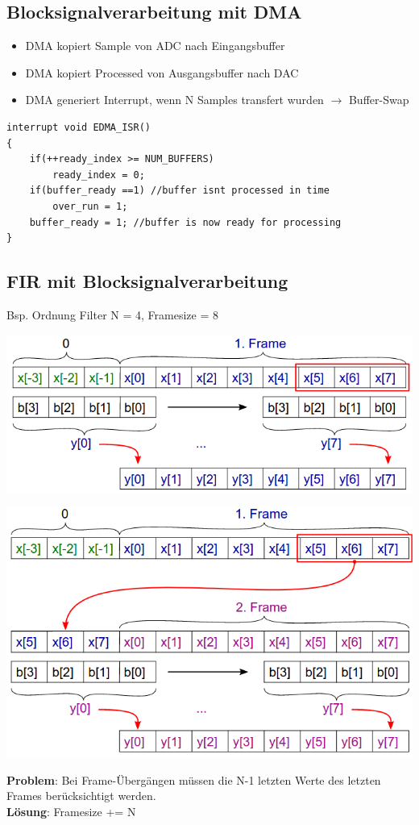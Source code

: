 \documentclass[10pt,a4paper]{article}
\begin{document}
\subsection{Blocksignalverarbeitung mit DMA}
\begin{itemize}
    \item DMA kopiert Sample von ADC nach Eingangsbuffer
    \item DMA kopiert Processed von Ausgangsbuffer nach DAC
    \item DMA generiert Interrupt, wenn N Samples transfert wurden $\rightarrow$ Buffer-Swap
\end{itemize}
\begin{verbatim}
interrupt void EDMA_ISR()
{
    if(++ready_index >= NUM_BUFFERS)
        ready_index = 0;
    if(buffer_ready ==1) //buffer isnt processed in time
        over_run = 1;
    buffer_ready = 1; //buffer is now ready for processing
}
\end{verbatim}

\subsection{FIR mit Blocksignalverarbeitung}
Bsp. Ordnung Filter N = 4, Framesize = 8\\
  \begin{right}
      \includegraphics[width=.25\textwidth]{./img/firframe1.png}
  \end{right}
  \begin{right}
      \includegraphics[width=.25\textwidth]{./img/firframe2.png}
  \end{right}
\textbf{Problem}: Bei Frame-Übergängen müssen die N-1 letzten Werte des letzten Frames berücksichtigt werden.\\
\textbf{Lösung}: Framesize += N
\end{document}
